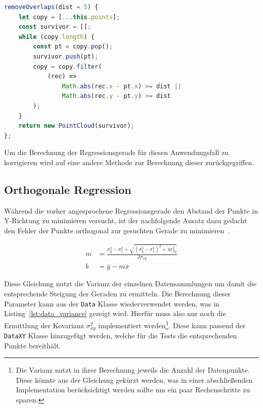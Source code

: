 \begin{lstlisting}[language=JavaScript, caption={Definition der \lstinline{removeOverlaps} Funktion der \lstinline{PointCloud} Klasse.}, label={lst:pointcloud_removeOverlaps}]
removeOverlaps(dist = 5) {
    let copy = [...this.points];
    const survivor = [];
    while (copy.length) {
        const pt = copy.pop();
        survivor.push(pt);
        copy = copy.filter(
            (rec) =>
                Math.abs(rec.x - pt.x) >= dist ||
                Math.abs(rec.y - pt.y) >= dist
        );
    }
    return new PointCloud(survivor);
};
\end{lstlisting}

Um die Berechnung der Regressionsgerade für diesen Anwendungsfall zu korrigieren wird auf eine andere Methode zur Berechnung dieser zurückgegriffen.

\subsection{Orthogonale Regression}\label{ch:orthogonale_regression}

Während die vorher angesprochene Regressionsgerade den Abstand der Punkte in Y-Richtung zu minimieren versucht, ist der nachfolgende Ansatz dazu gedacht den Fehler der Punkte orthogonal zur gesuchten Gerade zu minimieren~\cite[S.~140]{JuergenHedderich2020}.

\begin{equation}
    \begin{split}
        m &= \frac{\sigma_y^2 - \sigma_x^2 + \sqrt{(\sigma_y^2 - \sigma_x^2)^2 + 4\sigma_{xy}^2}}{2\sigma_{xy}} \\
        b &= \bar{y} - m \bar{x}
    \end{split}
    \label{eq:orthogonal_regression}
\end{equation}

Diese Gleichung nutzt die Varianz der einzelnen Datensammlungen um damit die entsprechende Steigung der Geraden zu ermitteln.
Die Berechnung dieser Parameter kann aus der \lstinline{Data} Klasse wiederverwendet werden, was in Listing~\ref{lst:data_variance} gezeigt wird.
Hierfür muss also nur noch die Ermittlung der Kovarianz $\sigma_{xy}^2$ implementiert werden\footnote{Die Varianz nutzt in ihrer Berechnung jeweils die Anzahl der Datenpunkte. Diese könnte aus der Gleichung gekürzt werden, was in einer abschlie{\ss}enden Implementation berücksichtigt werden sollte um ein paar Rechenschritte zu sparen.}.
Diese kann passend der \lstinline{DataXY} Klasse hinzugefügt werden, welche für die Tests die entsprechenden Punkte bereithält.

